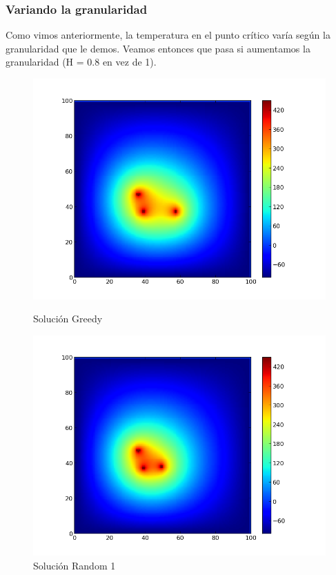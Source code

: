\subsubsection{Variando la granularidad}

Como vimos anteriormente, la temperatura en el punto crítico varía según la granularidad que le demos. Veamos entonces que pasa si aumentamos la granularidad (H = 0.8 en vez de 1).

\begin{figure}[htb]
\begin{center}
\includegraphics[scale=0.40]{imagenes/test6_g08_greedy.png} 
\caption{Solución Greedy} 

        \end{center}
\endminipage\hfill
{}
\begin{center}
\includegraphics[scale=0.40]{imagenes/test6_g08_random.png} 
\caption{Solución Random 1} 
        \end{center}
\endminipage\hfill 
\end{figure}
